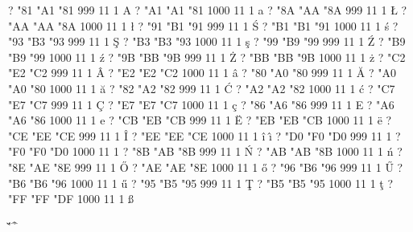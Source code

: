 \setcharcode  ?  "81  "A1  "81   999  11  1  \texaccent \og A
\setcharcode  ?  "A1  "A1  "81  1000  11  1  \texaccent \og a
\setcharcode  ?  "8A  "AA  "8A   999  11  1  \texmacro  \L
\setcharcode  ?  "AA  "AA  "8A  1000  11  1  \texmacro  \l
\setcharcode  ?  "91  "B1  "91   999  11  1  \texaccent \'S
\setcharcode  ?  "B1  "B1  "91  1000  11  1  \texaccent \'s
\setcharcode  ?  "93  "B3  "93   999  11  1  \texaccent \c S
\setcharcode  ?  "B3  "B3  "93  1000  11  1  \texaccent \c s
\setcharcode  ?  "99  "B9  "99   999  11  1  \texaccent \'Z
\setcharcode  ?  "B9  "B9  "99  1000  11  1  \texaccent \'z
\setcharcode  ?  "9B  "BB  "9B   999  11  1  \texaccent \.Z
\setcharcode  ?  "BB  "BB  "9B  1000  11  1  \texaccent \.z
\setcharcode  ?  "C2  "E2  "C2   999  11  1  \texaccent \^A
\setcharcode  ?  "E2  "E2  "C2  1000  11  1  \texaccent \^a
\setcharcode  ?  "80  "A0  "80   999  11  1  \texaccent \u A
\setcharcode  ?  "A0  "A0  "80  1000  11  1  \texaccent \u a
\setcharcode  ?  "82  "A2  "82   999  11  1  \texaccent \'C
\setcharcode  ?  "A2  "A2  "82  1000  11  1  \texaccent \'c
\setcharcode  ?  "C7  "E7  "C7   999  11  1  \texaccent \c C
\setcharcode  ?  "E7  "E7  "C7  1000  11  1  \texaccent \c c
\setcharcode  ?  "86  "A6  "86   999  11  1  \texaccent \og E
\setcharcode  ?  "A6  "A6  "86  1000  11  1  \texaccent \og e
\setcharcode  ?  "CB  "EB  "CB   999  11  1  \texaccent \"E
\setcharcode  ?  "EB  "EB  "CB  1000  11  1  \texaccent \"e
\setcharcode  ?  "CE  "EE  "CE   999  11  1  \texaccent \^I
\setcharcode  ?  "EE  "EE  "CE  1000  11  1  \texaccent \^i  \texaccent \^\i
\setcharcode  ?  "D0  "F0  "D0   999  11  1  \texmacro \Dslash
\setcharcode  ?  "F0  "F0  "D0  1000  11  1  \texmacro \dslash
\setcharcode  ?  "8B  "AB  "8B   999  11  1  \texaccent \'N
\setcharcode  ?  "AB  "AB  "8B  1000  11  1  \texaccent \'n
\setcharcode  ?  "8E  "AE  "8E   999  11  1  \texaccent \H O
\setcharcode  ?  "AE  "AE  "8E  1000  11  1  \texaccent \H o
\setcharcode  ?  "96  "B6  "96   999  11  1  \texaccent \H U
\setcharcode  ?  "B6  "B6  "96  1000  11  1  \texaccent \H u
\setcharcode  ?  "95  "B5  "95   999  11  1  \texaccent \c T
\setcharcode  ?  "B5  "B5  "95  1000  11  1  \texaccent \c t
\setcharcode  ?  "FF  "FF  "DF  1000  11  1  \texmacro  \ss

\redefaccent \'
\redefaccent \v
\redefaccent \"
\redefaccent \^
\redefaccent \r



\endinput

